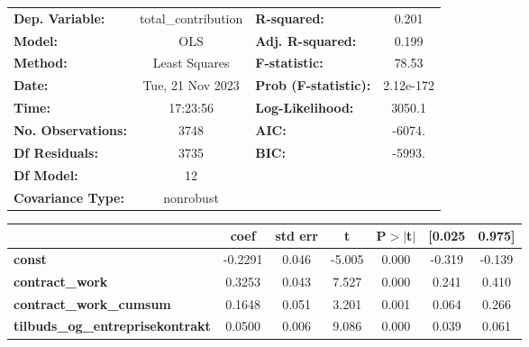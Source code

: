 \begin{center}
\begin{tabular}{lclc}
\toprule
\textbf{Dep. Variable:}                   & total\_contribution & \textbf{  R-squared:         } &     0.201   \\
\textbf{Model:}                           &         OLS         & \textbf{  Adj. R-squared:    } &     0.199   \\
\textbf{Method:}                          &    Least Squares    & \textbf{  F-statistic:       } &     78.53   \\
\textbf{Date:}                            &   Tue, 21 Nov 2023  & \textbf{  Prob (F-statistic):} & 2.12e-172   \\
\textbf{Time:}                            &       17:23:56      & \textbf{  Log-Likelihood:    } &    3050.1   \\
\textbf{No. Observations:}                &          3748       & \textbf{  AIC:               } &    -6074.   \\
\textbf{Df Residuals:}                    &          3735       & \textbf{  BIC:               } &    -5993.   \\
\textbf{Df Model:}                        &            12       & \textbf{                     } &             \\
\textbf{Covariance Type:}                 &      nonrobust      & \textbf{                     } &             \\
\bottomrule
\end{tabular}
\begin{tabular}{lcccccc}
                                          & \textbf{coef} & \textbf{std err} & \textbf{t} & \textbf{P$> |$t$|$} & \textbf{[0.025} & \textbf{0.975]}  \\
\midrule
\textbf{const}                            &      -0.2291  &        0.046     &    -5.005  &         0.000        &       -0.319    &       -0.139     \\
\textbf{contract\_work}                   &       0.3253  &        0.043     &     7.527  &         0.000        &        0.241    &        0.410     \\
\textbf{contract\_work\_cumsum}           &       0.1648  &        0.051     &     3.201  &         0.001        &        0.064    &        0.266     \\
\textbf{tilbuds\_og\_entreprisekontrakt}  &       0.0500  &        0.006     &     9.086  &         0.000        &        0.039    &        0.061     \\

\end{tabular}
\end{center}
